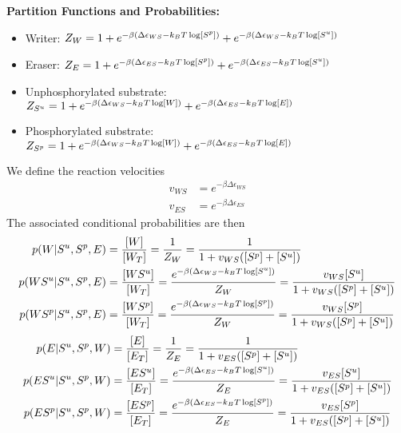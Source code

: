 \documentclass[aps,onecolumn,superscriptaddress,notitlepage]{revtex4-1}
\begin{document}
\textbf{Partition Functions and Probabilities:}
\begin{itemize}
\item Writer: $Z_W = 1 + e^{-\beta\qty(\Delta\epsilon_{WS} -k_BT \log[S^p])} + e^{-\beta\qty(\Delta\epsilon_{WS} -k_BT \log[S^u])}$
\item Eraser: $Z_E = 1 + e^{-\beta\qty(\Delta\epsilon_{ES} -k_BT \log[S^p])} + e^{-\beta\qty(\Delta\epsilon_{ES} -k_BT \log[S^u])}$
\item Unphosphorylated substrate: $Z_{S^u} = 1 + e^{-\beta\qty(\Delta\epsilon_{WS} -k_BT \log[W])} + e^{-\beta\qty(\Delta\epsilon_{ES} -k_BT \log[E])}$
\item Phosphorylated substrate: $Z_{S^p} = 1  + e^{-\beta\qty(\Delta\epsilon_{WS} -k_BT \log[W])} + e^{-\beta\qty(\Delta\epsilon_{ES} -k_BT \log[E])}$
\end{itemize}
We define the reaction velocities
\begin{align}
v_{WS} &= e^{-\beta\Delta\epsilon_{WS}}\\
v_{ES} &= e^{-\beta\Delta\epsilon_{ES}}
\end{align}
The associated conditional probabilities are then
\begin{align}
p(W|S^u,S^p, E) &= \frac{[W]}{[W_T]} = \frac{1}{Z_W} =  \frac{1}{1 + v_{WS}([S^p]+[S^u])}\\
p(WS^u|S^u,S^p, E) &= \frac{[WS^u]}{[W_T]}  = \frac{e^{-\beta\qty(\Delta\epsilon_{WS} -k_BT \log[S^u])}}{Z_W} =  \frac{v_{WS}[S^u]}{1 + v_{WS}([S^p]+[S^u])}\\
p(WS^p|S^u,S^p, E) &= \frac{[WS^p]}{[W_T]}  = \frac{e^{-\beta\qty(\Delta\epsilon_{WS} -k_BT \log[S^p])}}{Z_W} =  \frac{v_{WS}[S^p]}{1 + v_{WS}([S^p]+[S^u])}
\end{align}
\begin{align}
p(E|S^u,S^p, W) &= \frac{[E]}{[E_T]} = \frac{1}{Z_E} =  \frac{1}{1 + v_{ES}([S^p]+[S^u])}\\
p(ES^u|S^u,S^p, W) &= \frac{[ES^u]}{[E_T]}  = \frac{e^{-\beta\qty(\Delta\epsilon_{ES} -k_BT \log[S^u])}}{Z_E} =  \frac{v_{ES}[S^u]}{1 + v_{ES}([S^p]+[S^u])}\\
p(ES^p|S^u,S^p, W) &= \frac{[ES^p]}{[E_T]}  = \frac{e^{-\beta\qty(\Delta\epsilon_{ES} -k_BT \log[S^p])}}{Z_E} =  \frac{v_{ES}[S^p]}{1 + v_{ES}([S^p]+[S^u])}
\end{align}
\end{document}
